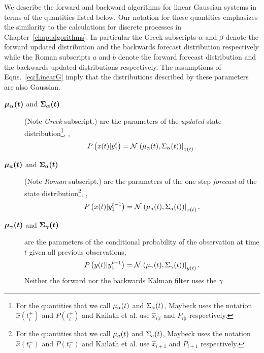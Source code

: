 We describe the forward and backward algorithms for linear Gaussian
systems in terms of the quantities listed below.  Our notation for
these quantities emphasizes the similarity to the calculations for
discrete processes in Chapter~\ref{chap:algorithms}.  In particular
the Greek subscripts $\alpha$ and $\beta$ denote the forward updated
distribution and the backwards forecast distribution respectively while
the Roman subscripts $a$ and $b$ denote the forward forecast
distribution and the backwards updated distributions respectively.
The assumptions of Eqns.~\eqref{eq:LinearG} imply that the
distributions described by these parameters are also Gaussian.
\begin{description}
\item[$\bm{{\mu_\alpha}{(t)}}$ and $\bm{{\Sigma_\alpha}{(t)}}$]
  (Note \emph{Greek} subscript.) are the parameters of the
  \emph{updated} state distribution\footnote{For the quantities that
    we call ${\mu_\alpha}{(t)}$ and ${\Sigma_\alpha}{(t)}$,
    Maybeck\cite{Maybeck82} uses the notation $\hat x(t^+_i)$ and
    $P(t^+_i)$ and Kailath et al.\cite{KSH00} use $\hat x_{i|i}$ and
    $P_{i|i}$ respectively.}, \ie,
  \begin{equation*}
    P\left({x}{(t)}|y_{1}^{t} \right) =
    {\mathcal{N}}\left.\left({\mu_\alpha}{(t)},{\Sigma_\alpha}{(t)}\right)\right|_{{x}{(t)}}.
  \end{equation*}
\item[$\bm{{\mu_a}{(t)}}$ and $\bm{{\Sigma_a}{(t)}}$] (Note
  \emph{Roman} subscript.) are the parameters of the one step
  \emph{forecast} of the state distribution\footnote{For the
    quantities that we call ${\mu_a}{(t)}$ and ${\Sigma_a}{(t)}$,
    Maybeck\cite{Maybeck82} uses the notation $\hat x(t^-_i)$ and
    $P(t^-_i)$ and Kailath et al.\cite{KSH00} use $\hat x_{i+1}$ and
    $P_{i+1}$ respectively.}, \ie,
  \begin{equation*}
    P \left({x}{(t)}|y_{1}^{t-1} \right) =
    {\mathcal{N}}\left.\left({\mu_a}{(t)},{\Sigma_a}{(t)}\right)\right|_{{x}{(t)}}.
  \end{equation*}
\item[$\bm{{\mu_\gamma}{(t)}}$ and $\bm{{\Sigma_\gamma}{(t)}}$] are
  the parameters of the conditional probability of the observation at
  time $t$ given all previous observations, \ie
  \begin{equation*}
    P\left({y}{(t)}|y_{1}^{t-1} \right) =
    {\mathcal{N}}\left.\left({\mu_\gamma}{(t)},{\Sigma_\gamma}{(t)}\right)\right|_{{y}{(t)}}.
  \end{equation*}
  Neither the forward nor the backwards Kalman filter uses the $\gamma$

\end{description}

